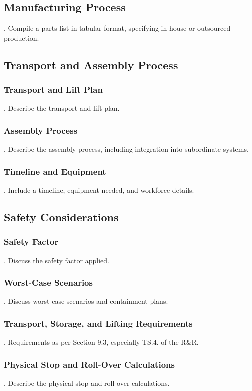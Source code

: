 \subsection{Manufacturing Process}
.  Compile a parts list in tabular format, specifying in-house or outsourced production.

\subsection{Transport and Assembly Process}
\subsubsection{Transport and Lift Plan}
.  Describe the transport and lift plan.
\subsubsection{Assembly Process}
.  Describe the assembly process, including integration into subordinate systems.
\subsubsection{Timeline and Equipment}
.  Include a timeline, equipment needed, and workforce details.

\subsection{Safety Considerations}
\subsubsection{Safety Factor}
.  Discuss the safety factor applied.
\subsubsection{Worst-Case Scenarios}
.  Discuss worst-case scenarios and containment plans.
\subsubsection{Transport, Storage, and Lifting Requirements}
.  Requirements as per Section 9.3, especially TS.4. of the R&R.
\subsubsection{Physical Stop and Roll-Over Calculations}
.  Describe the physical stop and roll-over calculations.

